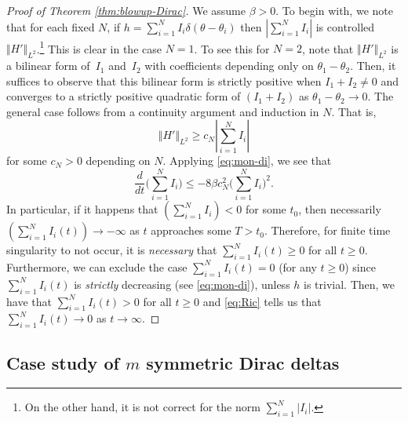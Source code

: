 \documentclass[JEP,XML,SOM,Unicode,NoFloatCountersInSection,published]{cedram}
\theoremstyle{plain}
\theoremstyle{definition}
\newcommand{\nrm}[1]{\Vert#1\Vert}
\let\bt\beta
\let\dlt\delta
\let\tht\theta
\begin{document}
\begin{proof}[Proof of Theorem \ref{thm:blowup-Dirac}]

We assume $\bt>0$. To begin with, we note that for each fixed $N$, if $h = \sum_{i=1}^{N} I_i\dlt(\tht-\tht_i)$ then $|\sum_{i=1}^{N} I_i|$ is controlled $\nrm{H'}_{L^{2}}$.\footnote{On the other hand, it is not correct for the norm $\sum_{i=1}^{N} |I_i|$.} This is clear in the case $N=1$. To see this for $N=2$, note that $\nrm{H'}_{L^2}$ is a bilinear form of~$I_1$ and~$I_2$ with coefficients depending only on $\tht_1-\tht_2$. Then, it suffices to observe that this bilinear form is strictly positive when $I_1+I_2 \ne 0$ and converges to a strictly positive quadratic form of $(I_1+I_2)$ as $\tht_1-\tht_2 \to 0$. The general case follows from a continuity argument and induction in $N$. That is,
\begin{equation*}
\nrm{H'}_{L^2} \ge c_N|\sum_{i=1}^{N} I_i|
\end{equation*}
for some $c_N>0$ depending on $N$. Applying \eqref{eq:mon-di}, we see that
\begin{equation}\label{eq:Ric}
\frac{d}{dt} \biggl(\sum_{i=1}^{N} I_i\biggr) \le -8\bt c_{N}^{2} \biggl(\sum_{i=1}^{N} I_i\biggr)^{2}.
\end{equation}
In particular, if it happens that $(\sum_{i=1}^{N} I_i) < 0$ for some $t_0$, then necessarily $(\sum_{i=1}^{N} I_i(t)) \to -\infty$ as $t$ approaches some $T>t_0$. Therefore, for finite time singularity to not occur, it is \textit{necessary} that $\sum_{i=1}^{N} I_i(t) \ge 0$ for all $t\ge0$. Furthermore, we can exclude the case $\sum_{i=1}^{N} I_i(t) = 0$ (for any $t\ge0$) since $\sum_{i=1}^{N} I_i(t)$ is \textit{strictly} decreasing (see \eqref{eq:mon-di}), unless $h$ is trivial. Then, we have that $\sum_{i=1}^{N} I_i(t) > 0$ for all $t\ge0$ and \eqref{eq:Ric} tells us that $\sum_{i=1}^{N} I_i(t) \to 0$ as $t\to\infty$.\end{proof}

\subsection{Case study of $m$ symmetric Dirac deltas}\label{subsec:case-study}
\end{document}
